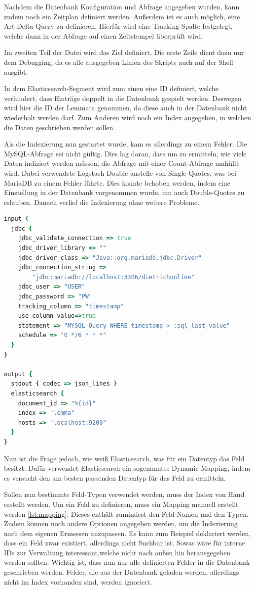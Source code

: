 Nachdem die Datenbank Konfiguration und Abfrage angegeben wurden, kann zudem noch ein Zeitplan definiert werden. Außerdem ist es auch möglich, eine Art Delta-Query zu definieren. Hierfür wird eine Tracking-Spalte festgelegt, welche dann in der Abfrage auf einen Zeitstempel überprüft wird.

Im zweiten Teil der Datei wird das Ziel definiert. Die erste Zeile dient dazu nur dem Debugging, da es alle ausgegeben Linien des Skripts auch auf der Shell ausgibt. 

In dem Elasticsearch-Segment wird zum einen eine ID definiert, welche verhindert, dass Einträge doppelt in die Datenbank gespielt werden. Deswegen wird hier die ID der Lemmata genommen, da diese auch in der Datenbank nicht wiederholt werden darf. Zum Anderen wird noch ein Index angegeben, in welchen die Daten geschrieben werden sollen. 

Als die Indexierung nun gestartet wurde, kam es allerdings zu einem Fehler. Die MySQL-Abfrage sei nicht gültig. Dies lag daran, dass um zu ermitteln, wie viele Daten indiziert werden müssen, die Abfrage mit einer Count-Abfrage umhüllt wird. Dabei verwendete Logstash Double anstelle von Single-Quotes, was bei MariaDB zu einem Fehler führte. Dies konnte behoben werden, indem eine Einstellung in der Datenbank vorgenommen wurde, um auch Double-Quotes zu erlauben. 
Danach verlief die Indexierung ohne weitere Probleme.

\begin{lstlisting}[language=Ruby, frame=single, label={lst:lsConf}] 
input {
  jdbc {
    jdbc_validate_connection => true
    jdbc_driver_library => ""
    jdbc_driver_class => "Java::org.mariadb.jdbc.Driver"
    jdbc_connection_string =>
        "jdbc:mariadb://localhost:3306/dietrichonline"
    jdbc_user => "USER"
    jdbc_password => "PW"
    tracking_column => "timestamp"
    use_column_value=>true
    statement => "MYSQL-Query WHERE timestamp > :sql_last_value"
    schedule => "0 */6 * * *"
  }
}

output {
  stdout { codec => json_lines }
  elasticsearch {
    document_id => "%{id}"
    index => "lemma"
    hosts => "localhost:9200"
  }
}
\end{lstlisting}

Nun ist die Frage jedoch, wie weiß Elasticsearch, was für ein Datentyp das Feld besitzt. Dafür verwendet Elasticsearch ein sogenanntes Dynamic-Mapping, indem es versucht den am besten passenden Datentyp für das Feld zu ermitteln.

Sollen nun bestimmte Feld-Typen verwendet werden, muss der Index von Hand erstellt werden. Um ein Feld zu definieren, muss ein Mapping manuell erstellt werden \ref{lst:mapping}. Dieses enthält zumindest den Feld-Namen und den Typen. Zudem können noch andere Optionen angegeben werden, um die Indexierung nach dem eigenen Ermessen anzupassen. Es kann zum Beispiel deklariert werden, dass ein Feld zwar existiert, allerdings nicht Suchbar ist. Sowas wäre für interne IDs zur Verwaltung interessant,welche nicht nach außen hin herausgegeben werden sollten. Wichtig ist, dass nun nur alle definierten Felder in die Datenbank geschrieben werden. Felder, die aus der Datenbank geladen werden, allerdings nicht im Index vorhanden sind, werden ignoriert.

